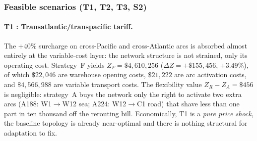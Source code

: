 \subsubsection*{Feasible scenarios (T1, T2, T3, S2)}

\paragraph{T1 : Transatlantic/transpacific tariff.}
The $+40\%$ surcharge on cross-Pacific and cross-Atlantic arcs is
absorbed almost entirely at the variable-cost layer: the network
structure is not strained, only its operating cost. Strategy~F yields
$Z_F = \$4{,}610{,}256$ ($\Delta Z = +\$155{,}456$, $+3.49\%$),
of which $\$22{,}046$ are warehouse opening costs, $\$21{,}222$ are
arc activation costs, and $\$4{,}566{,}988$ are variable transport
costs. The flexibility value $Z_R - Z_A = \$456$ is negligible:
strategy~A buys the network only the right to activate two extra
arcs (A188: W1$\rightarrow$W12 sea; A224: W12$\rightarrow$C1 road)
that shave less than one part in ten thousand off the rerouting bill.
Economically, T1 is a \emph{pure price shock}, the baseline topology
is already near-optimal and there is nothing structural for
adaptation to fix.

\begin{table}[H]
\centering
\caption{Cost decomposition --- scenario T1 (\$).}
\label{tab:cost_decomp_t1}
\end{table}

